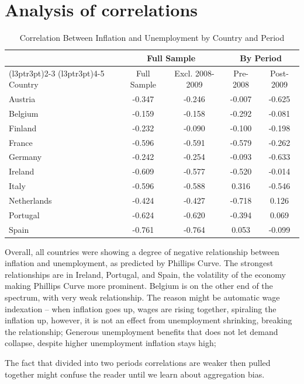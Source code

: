 \documentclass[preprint,10pt,authoryear]{elsarticle}
\begin{document}
\section{Analysis of correlations}

\begin{table}[H]
\centering
\caption{\label{tab:tab:correl}Correlation Between Inflation and Unemployment by Country and Period}
\centering
\begin{tabular}[t]{lc>{}c|cc}
\toprule
\multicolumn{1}{c}{ } & \multicolumn{2}{c}{Full Sample} & \multicolumn{2}{c}{By Period} \\
\cmidrule(l{3pt}r{3pt}){2-3} \cmidrule(l{3pt}r{3pt}){4-5}
Country & Full Sample & Excl. 2008-2009 & Pre-2008 & Post-2009\\
\midrule
Austria & -0.347 & -0.246 & -0.007 & -0.625\\
Belgium & -0.159 & -0.158 & -0.292 & -0.081\\
Finland & -0.232 & -0.090 & -0.100 & -0.198\\
France & -0.596 & -0.591 & -0.579 & -0.262\\
Germany & -0.242 & -0.254 & -0.093 & -0.633\\
\addlinespace
Ireland & -0.609 & -0.577 & -0.520 & -0.014\\
Italy & -0.596 & -0.588 & 0.316 & -0.546\\
Netherlands & -0.424 & -0.427 & -0.718 & 0.126\\
Portugal & -0.624 & -0.620 & -0.394 & 0.069\\
Spain & -0.761 & -0.764 & 0.053 & -0.099\\
\bottomrule
\end{tabular}
\end{table}

Overall, all countries were showing a degree of negative relationship between inflation and unemployment, as predicted by Phillips Curve. The strongest relationships are in Ireland, Portugal, and Spain, the volatility of the economy making Phillips Curve more prominent. Belgium is on the other end of the spectrum, with very weak relationship. The reason might be automatic wage indexation – when inflation goes up, wages are rising together, spiraling the inflation up, however, it is not an effect from unemployment shrinking, breaking the relationship; Generous unemployment benefits that does not let demand collapse, despite higher unemployment inflation stays high;

The fact that divided into two periods correlations are weaker then pulled together might confuse the reader until we learn about aggregation bias.
\end{document}
